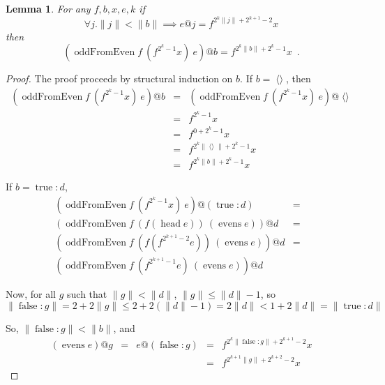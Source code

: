 \documentclass[envcountsect]{llncs}
\DeclareMathOperator{\oddFrom}{oddFromEven}
\DeclareMathOperator{\nil}{\langle\rangle}
\DeclareMathOperator{\true}{true}
\DeclareMathOperator{\false}{false}
\DeclareMathOperator{\head}{head}
\DeclareMathOperator{\evens}{evens}
\newcommand{\ord}[1]{\|#1\|}
\newcommand{\cons}[2]{#1:#2}
\newtheorem{lemma}[theorem]{Lemma}
\begin{document}
\begin{lemma}\label{oddFromLemma}
For any $f, b, x, e, k$
if
\begin{displaymath}
\forall j . \ord{j} < \ord{b} \implies e@j = f^{2^k\ord{j}+2^{k+1}-2}x
\end{displaymath}
then
\begin{displaymath}
(\oddFrom f\ (f^{2^k-1}x)\ e)@b = f^{2^k\ord{b}+2^k-1}x\enspace.
\end{displaymath}
\end{lemma}
\begin{proof}
The proof proceeds by structural induction on $b$. If $b = \nil$, then 
\begin{displaymath}
\begin{array}{rcl}
(\oddFrom f\ (f^{2^k-1}x)\ e)@b & = & (\oddFrom f\ (f^{2^k-1}x)\ e)@\nil \\
& = & f^{2^k-1}x \\
& = & f^{0+2^k-1}x \\
& = & f^{2^k\ord{\nil}+2^k-1}x \\
& = & f^{2^k\ord{b}+2^k-1}x
\end{array}
\end{displaymath}

If $b = \cons{\true}{d}$,
\begin{displaymath}
\begin{array}{rcl}
(\oddFrom f\ (f^{2^k-1}x)\ e)@(\cons{\true}{d})& = & \\
(\oddFrom f\ (f (\head e))\ (\evens e))@d& = & \\
(\oddFrom f\ (f (f^{2^{k+1}-2}e))\ (\evens e))@d& = & \\
(\oddFrom f\ (f^{2^{k+1}-1}e)\ (\evens e))@d&  & 
\end{array}
\end{displaymath}

Now, for all $g$ such that $\ord{g} < \ord{d}$, $\ord{g} \leq \ord{d}-1$, so 
\begin{displaymath}
\ord{\cons{\false}{g}} = 2 + 2\ord{g} \leq 2 + 2(\ord{d} -1) = 2\ord{d} < 1+2\ord{d} = \ord{\cons{\true}{d}}
\end{displaymath}

So, $\ord{\cons{\false}{g}} < \ord{b}$, and 
\begin{displaymath}
\begin{array}{rcccl}
(\evens e)@g & = & e@(\cons{\false}{g}) & = & f^{2^k\ord{\cons{\false}{g}}+2^{k+1}-2}x \\
& & & = & f^{2^{k+1}\ord{g}+2^{k+2}-2}x 
\end{array}
\end{displaymath}


\end{proof}
\end{document}
